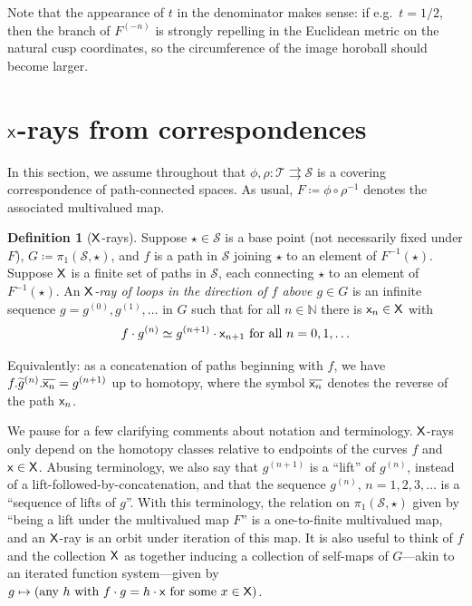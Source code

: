 \documentclass{amsart}
\newcommand\N{{\mathbb{N}}}
\theoremstyle{definition}
\newtheorem{defn}[thm]{Definition}
\theoremstyle{remark}
\newcommand{\sfX}{{\sf X}}
\newcommand{\sfx}{{\sf x}}
\newcommand{\cT}{\mathcal{T}}
\newcommand{\cS}{\mathcal{S}}
\begin{document}
Note that the appearance of $t$ in the denominator makes sense: if e.g.\ $t=1/2$,  then the branch of $F^{(-n)}$ is strongly repelling in the Euclidean metric on the natural cusp coordinates, so the circumference of the image horoball should become larger. 

\section{$\sfX$-rays from correspondences}\label{secn:xrays}
In this section, we assume throughout that $\phi, \rho\colon \cT \rightrightarrows\cS$ is a covering correspondence of path-connected spaces.  As usual, $F\coloneqq\phi \circ \rho^{-1}$ denotes the associated multivalued map.  

\begin{defn}[$\sfX$-rays]\label{def:xray}
  Suppose $\star\in \cS$ is a base point (not necessarily fixed under $F$), $G\coloneqq\pi_1(\cS, \star)$, and $f$ is a path in $\cS$ joining $\star$ to an element of $F^{-1}(\star)$. Suppose $\sfX$ is a finite set of paths in $\cS$, each connecting $\star$ to an element of $F^{-1}(\star)$. An \emph{$\sfX$-ray of loops in the direction of  $f$ above $g\in G$} is an infinite sequence $g=g^{(0)},g^{(1)},\dots$ in $G$ such that for all $n\in\N$ there is $\sfx_n\in \sfX$ with
\[ f\cdot g^{(n)}\simeq g^{(n+1)}\cdot \sfx_{n+1}\text{ for all }n=0, 1,\ldots\]
\end{defn}
Equivalently: as a concatenation of paths beginning with $f$, we have $f.\widetilde{g}^{(n)}.\overline{\sfx_n} = g^{(n+1)}$ up to homotopy, where  the symbol $\overline{\sfx_n}$ denotes the reverse of the path $\sfx_n$.

We pause for a few clarifying comments about notation and terminology. $\sfX$-rays only depend on the homotopy classes relative to endpoints of the curves $f$ and $\sfx\in \sfX$.  Abusing terminology, we also say that $g^{(n+1)}$ is a ``lift'' of $g^{(n)}$, instead of a lift-followed-by-concatenation, and that the sequence $g^{(n)}$, $n=1, 2, 3, \ldots$ is a ``sequence of lifts of $g$''.  With this terminology, the relation on $\pi_1(\cS, \star)$ given by ``being a lift under the multivalued map $F$'' is a one-to-finite multivalued map, and an $\sfX$-ray is an orbit under iteration of this map.  It is also useful to think of $f$ and the collection $\sfX$ as together inducing a collection of self-maps of $G$---akin to an iterated function system---given by $g\mapsto(\text{any }h\text{ with }f\cdot g=h\cdot\sfx\text{ for some }x\in\sfX)$.
\end{document}
